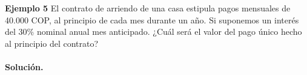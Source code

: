 \textbf{Ejemplo 5}\newline
El contrato de arriendo de una casa estipula pagos mensuales de 40.000 COP, al principio de cada mes durante un año. Si suponemos un interés del 30\% nominal anual mes anticipado. ¿Cuál será el valor del pago único hecho al principio del contrato?\\ \\

\textbf{Solución.}\\
